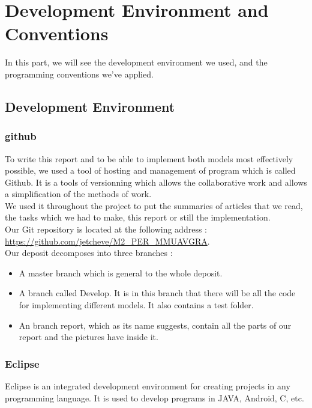 \chapter{Development Environment and Conventions}

In this part, we will see the development environment we used, and the programming conventions we've applied.

\section{Development Environment}

\subsection{github}

To write this report and to be able to implement both models most effectively possible, we used a tool of hosting and management of program which is called Github. It is a tools of versionning which allows the collaborative work and allows a simplification of the methods of work.\\
We used it throughout the project to put the summaries of articles that we read, the tasks which we had to make, this report or still the implementation.\\
Our Git repository is located at the following address : \\
\url{https://github.com/jetcheve/M2\_PER\_MMUAVGRA}.\\

Our deposit decomposes into three branches :

\begin{itemize}
\item A master branch which is general to the whole deposit.
\item A branch called Develop. It is in this branch that there will be all the code for implementing different models. It also contains a test folder. 
\item An branch report, which as its name suggests, contain all the parts of our report and the pictures have inside it.
\end{itemize}

\subsection{Eclipse}

Eclipse is an integrated development environment for creating projects in any programming language. It is used to develop programs in JAVA, Android, C, etc.\\

